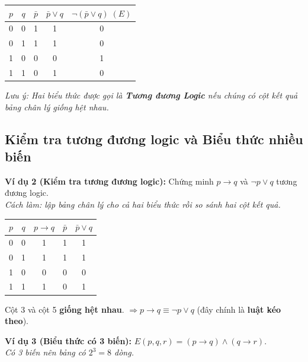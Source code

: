 \documentclass[12pt,a4paper]{article}
\begin{document}
\begin{center}
\renewcommand{\arraystretch}{1.2}
\begin{tabular}{|c|c|c|c|c|}
\hline
$p$ & $q$ & $\bar{p}$ & $\bar{p} \lor q$ & $\neg(\bar{p} \lor q)\;(E)$ \\ \hline
0 & 0 & 1 & 1 & 0 \\ \hline
0 & 1 & 1 & 1 & 0 \\ \hline
1 & 0 & 0 & 0 & \textcolor{AccentRed}{1} \\ \hline
1 & 1 & 0 & 1 & 0 \\ \hline
\end{tabular}
\end{center}

\textit{Lưu ý: Hai biểu thức được gọi là \textbf{Tương đương Logic} nếu chúng có cột kết quả bảng chân lý giống hệt nhau.}

\subsection{Kiểm tra tương đương logic và Biểu thức nhiều biến}

\textbf{Ví dụ 2 (Kiểm tra tương đương logic):} Chứng minh $p \to q$ và $\neg p \lor q$ tương đương logic.\\
\textit{Cách làm: lập bảng chân lý cho cả hai biểu thức rồi so sánh hai cột kết quả.}

\begin{center}
\renewcommand{\arraystretch}{1.2}
\begin{tabular}{|c|c|c|c|c|}
\hline
$p$ & $q$ & $p \to q$ & $\bar{p}$ & $\bar{p} \lor q$ \\ \hline
0 & 0 & \textcolor{AccentRed}{1} & 1 & \textcolor{AccentRed}{1} \\ \hline
0 & 1 & \textcolor{AccentRed}{1} & 1 & \textcolor{AccentRed}{1} \\ \hline
1 & 0 & \textcolor{AccentRed}{0} & 0 & \textcolor{AccentRed}{0} \\ \hline
1 & 1 & \textcolor{AccentRed}{1} & 0 & \textcolor{AccentRed}{1} \\ \hline
\end{tabular}
\end{center}

Cột 3 và cột 5 \textbf{giống hệt nhau}. $\Rightarrow p \to q \equiv \neg p \lor q$ (đây chính là \textbf{luật kéo theo}).

\vspace{6pt}
\textbf{Ví dụ 3 (Biểu thức có 3 biến):} $E(p, q, r) = (p \to q) \land (q \to r)$.\\
\textit{Có 3 biến nên bảng có $2^3 = 8$ dòng.}
\end{document}
